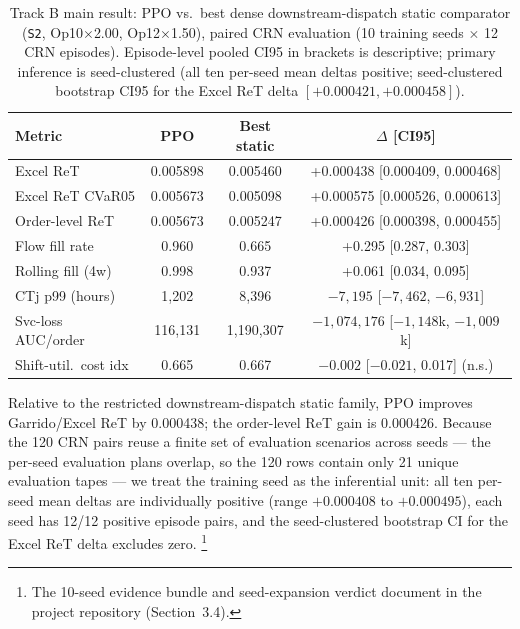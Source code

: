 \begin{table}[htbp]
\centering
\caption{Track B main result: PPO vs.\ best dense downstream-dispatch static comparator (\texttt{S2}, Op10$\times$2.00, Op12$\times$1.50), paired CRN evaluation (10 training seeds $\times$ 12 CRN episodes). Episode-level pooled CI95 in brackets is descriptive; primary inference is seed-clustered (all ten per-seed mean deltas positive; seed-clustered bootstrap CI95 for the Excel ReT delta $[+0.000421, +0.000458]$).}
\label{tab:track_b_main}
\footnotesize
\setlength{\tabcolsep}{3.0pt}
\begin{tabular}{lccc}
\toprule
Metric & PPO & Best static & $\Delta$ [CI95] \\
\midrule
Excel ReT & 0.005898 & 0.005460 & +0.000438 [0.000409, 0.000468] \\
Excel ReT CVaR05 & 0.005673 & 0.005098 & +0.000575 [0.000526, 0.000613] \\
Order-level ReT & 0.005673 & 0.005247 & +0.000426 [0.000398, 0.000455] \\
Flow fill rate & 0.960 & 0.665 & +0.295 [0.287, 0.303] \\
Rolling fill (4w) & 0.998 & 0.937 & +0.061 [0.034, 0.095] \\
CTj p99 (hours) & 1{,}202 & 8{,}396 & $-7{,}195$ [$-7{,}462$, $-6{,}931$] \\
Svc-loss AUC/order & 116{,}131 & 1{,}190{,}307 & $-1{,}074{,}176$ [$-1{,}148$k, $-1{,}009$k] \\
Shift-util.\ cost idx & 0.665 & 0.667 & $-0.002$ [$-0.021$, 0.017] (n.s.) \\
\bottomrule
\end{tabular}
\end{table}

Relative to the restricted downstream-dispatch static family, PPO improves
Garrido/Excel ReT by 0.000438; the order-level ReT gain is
0.000426. Because the 120 CRN pairs reuse a finite set of evaluation
scenarios across seeds --- the per-seed evaluation plans overlap, so the
120 rows contain only 21 unique evaluation tapes --- we treat the training
seed as the inferential
unit: all ten per-seed mean deltas are individually positive (range
$+0.000408$ to $+0.000495$), each seed has 12/12 positive episode pairs,
and the seed-clustered bootstrap CI for the Excel ReT delta excludes zero.
\footnote{The 10-seed evidence bundle and seed-expansion verdict document in the project repository (Section~3.4).}

